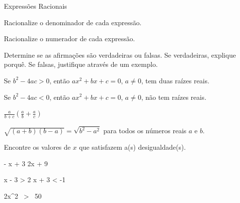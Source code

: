 \begin{exercicios}{Expressões Racionais}
    \begin{exercicio}
        Racionalize o denominador de cada expressão.
        \begin{mathlist}[2]
            \item {}
            \item {}
            \item {}
            \item {}
        \end{mathlist}    
    \end{exercicio}
    
    \begin{exercicio}
        Racionalize o numerador de cada expressão.
        \begin{mathlist}[2]
            \item {}
            \item {}
            \item {}
            \item {}
        \end{mathlist}        
    \end{exercicio}
    
    \begin{exercicio}
        Determine se as afirmações são verdadeiras ou falsas. Se verdadeiras, explique porquê. Se falsas, justifique através de um exemplo.
        \begin{alphalist}
            \item Se $b^2 - 4ac > 0$, então $ax^2 + bx + c = 0$, $a \neq 0$, tem duas raízes reais.
            \item Se $b^2 - 4ac < 0$, então $ax^2 + bx + c = 0$, $a \neq 0$, não tem raízes reais.
            \item \( \frac{a}{b + c} \left(\frac{a}{b} + \frac{a}{c}\right)\)
            \item \( \sqrt{(a + b) (b - a)} = \sqrt{b^2 - a^2}\) para todos os números reais $a$ e $b$.
        \end{alphalist}                                        
    \end{exercicio}
    
    \begin{exercicio}
        Encontre os valores de $x$ que satisfazem a(s) desigualdade(s).
        \begin{mathlist}
            \item - x + 3 \leq 2x + 9
            \item x - 3 > 2 \qquad {} \qquad x + 3 < -1
            \item 2x^2 \, > \, 50
        \end{mathlist}
    \end{exercicio}
    

\end{exercicios}
